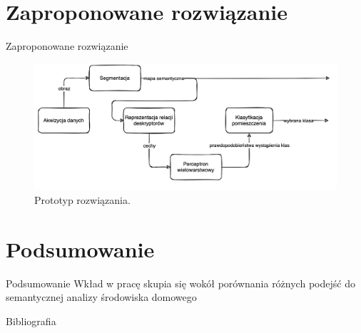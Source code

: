 \documentclass[10pt]{beamer}
\begin{document}
\section[Zaproponowane rozwiązanie]{Zaproponowane rozwiązanie}
\begin{frame}{Zaproponowane rozwiązanie}

    \begin{figure}
        \includegraphics[width=\textwidth]{images/own-solution.png}
        \caption{Prototyp rozwiązania.}
    \end{figure}

\end{frame}
\section[Podsumowanie]{Podsumowanie}
\begin{frame}{Podsumowanie}
  Wkład w pracę skupia się wokół porównania różnych podejść do semantycznej analizy środowiska domowego
\end{frame}

\begin{frame}[allowframebreaks]{Bibliografia}

    
    
  
  \end{frame}

 \section[Dziękuję za uwagę.]{}
\end{document}
